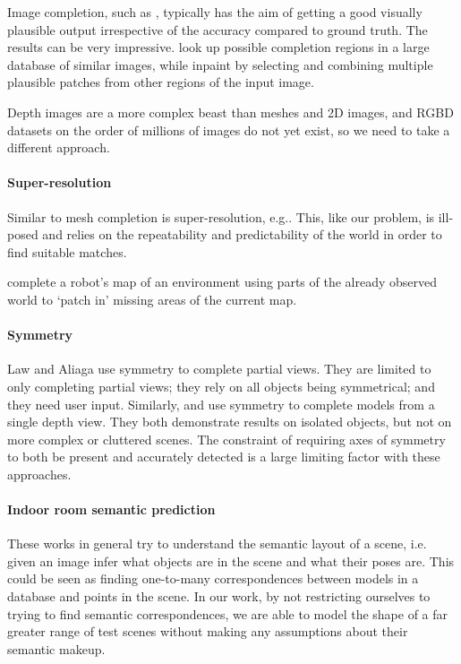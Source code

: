\documentclass[10pt,a4paper, twocolumn]{article}
\makeatletter
\newcommand*{\eg}{e.g.\@\xspace}
\newcommand*{\ie}{i.e.\@\xspace}
\makeatother
\begin{document}
Image completion, such as \cite{hays-siggraph-2007, criminisi-cvpr-2003}, typically has the aim of getting a good visually plausible output irrespective of the accuracy compared to ground truth. 
The results can be very impressive. 
\cite{hays-siggraph-2007} look up possible completion regions in a large database of similar images, while \cite{criminisi-cvpr-2003} inpaint by selecting and combining multiple plausible patches from other regions of the input image.

Depth images are a more complex beast than meshes and 2D images, and RGBD datasets on the order of millions of images do not yet exist, so we need to take a different approach.

\paragraph{Super-resolution}
Similar to mesh completion is super-resolution, \eg \cite{macaodha-eccv-2012}. 
This, like our problem, is ill-posed and relies on the repeatability and predictability of the world in order to find suitable matches.

\cite{chang-tor-2007} complete a robot's map of an environment using parts of the already observed world to  `patch in' missing areas of the current map.

\paragraph{Symmetry}
Law and Aliaga \cite{law-cviu-2010} use symmetry to complete partial views. 
They are limited to only completing partial views; they rely on all objects being symmetrical; and they need user input.
Similarly, \cite{thrun-iccv-2005} and \cite{kroemer-humanoids-2012} use symmetry to complete models from a single depth view. 
They both demonstrate results on isolated objects, but not on more complex or cluttered scenes. 
The constraint of requiring axes of symmetry to both be present and accurately detected is a large limiting factor with these approaches.

\paragraph{Indoor room semantic prediction}
These works in general try to understand the semantic layout of a scene, \ie given an image infer what objects are in the scene and what their poses are.
\cite{nan-acm-2012, minkim-siggraphasia-2012}
This could be seen as finding one-to-many correspondences between models in a database and points in the scene.
In our work, by not restricting ourselves to trying to find semantic correspondences, we are able to model the shape of a far greater range of test scenes without making any assumptions about their semantic makeup.
\end{document}
